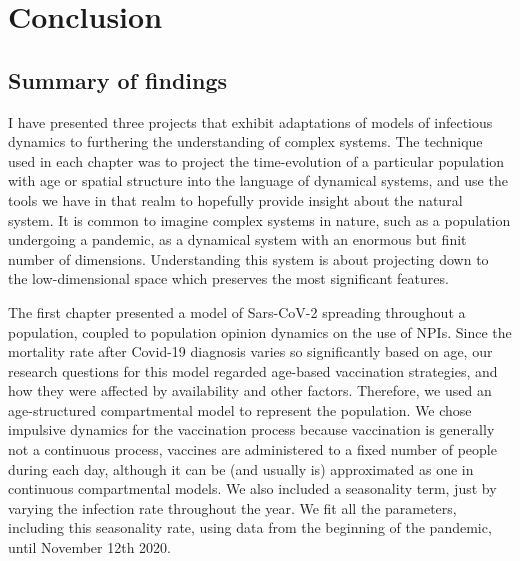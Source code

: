 \chapter{Conclusion}

\section{Summary of findings}

I have presented three projects that exhibit adaptations of models of infectious dynamics to furthering the understanding of complex systems. The technique used in each chapter was to project the time-evolution of a particular population with age or spatial structure into the language of dynamical systems, and use the tools we have in that realm to hopefully provide insight about the natural system. It is common to imagine complex systems in nature, such as a population undergoing a pandemic, as a dynamical system with an enormous but finit number of dimensions. Understanding this system is about projecting down to the low-dimensional space which preserves the most significant features. 

The first chapter presented a model of Sars-CoV-2 spreading throughout a population, coupled to population opinion dynamics on the use of NPIs. Since the mortality rate after Covid-19 diagnosis varies so significantly based on age, our research questions for this model regarded age-based vaccination strategies, and how they were affected by availability and other factors. Therefore, we used an age-structured compartmental model to represent the population. We chose impulsive dynamics for the vaccination process because vaccination is generally not a continuous process, vaccines are administered to a fixed number of people during each day, although it can be (and usually is) approximated as one in continuous compartmental models. We also included a seasonality term, just by varying the infection rate throughout the year. We fit all the parameters, including this seasonality rate, using data from the beginning of the pandemic, until November 12th 2020. 

